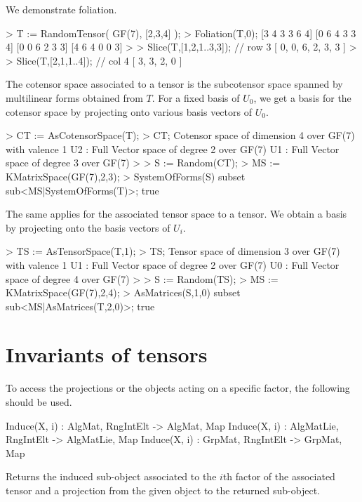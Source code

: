 \begin{example}
We demonstrate foliation.

\begin{code}
> T := RandomTensor( GF(7), [2,3,4] );
> Foliation(T,0);
[3 4 3 3 6 4]
[0 6 4 3 3 4]
[0 0 6 2 3 3]
[4 6 4 0 0 3]
> 
> Slice(T,[{1,2},{1..3},{3}]); // row 3
[ 0, 0, 6, 2, 3, 3 ]
> 
> Slice(T,[{2},{1},{1..4}]); // col 4
[ 3, 3, 2, 0 ]
\end{code}

The cotensor space associated to a tensor is the subcotensor space spanned by multilinear forms obtained from $T$.
For a fixed basis of $U_0$, we get a basis for the cotensor space by projecting onto various basis vectors of $U_0$.

\begin{code}
> CT := AsCotensorSpace(T);
> CT;
Cotensor space of dimension 4 over GF(7) with valence 1
U2 : Full Vector space of degree 2 over GF(7)
U1 : Full Vector space of degree 3 over GF(7)
> 
> S := Random(CT);
> MS := KMatrixSpace(GF(7),2,3);
> SystemOfForms(S) subset sub<MS|SystemOfForms(T)>;
true
\end{code}

The same applies for the associated tensor space to a tensor. 
We obtain a basis by projecting onto the basis vectors of $U_i$.

\begin{code}
> TS := AsTensorSpace(T,1);
> TS;
Tensor space of dimension 3 over GF(7) with valence 1
U1 : Full Vector space of degree 2 over GF(7)
U0 : Full Vector space of degree 4 over GF(7)
> 
> S := Random(TS);
> MS := KMatrixSpace(GF(7),2,4);
> AsMatrices(S,1,0) subset sub<MS|AsMatrices(T,2,0)>;
true
\end{code}
\end{example}

\section{Invariants of tensors}

To access the projections or the objects acting on a specific factor, the 
following should be used.

\begin{intrinsics}
Induce(X, i) : AlgMat, RngIntElt -> AlgMat, Map
Induce(X, i) : AlgMatLie, RngIntElt -> AlgMatLie, Map
Induce(X, i) : GrpMat, RngIntElt -> GrpMat, Map
\end{intrinsics}

Returns the induced sub-object associated to the $i$th factor of the 
associated 
tensor and a projection from the given object to the returned sub-object.

